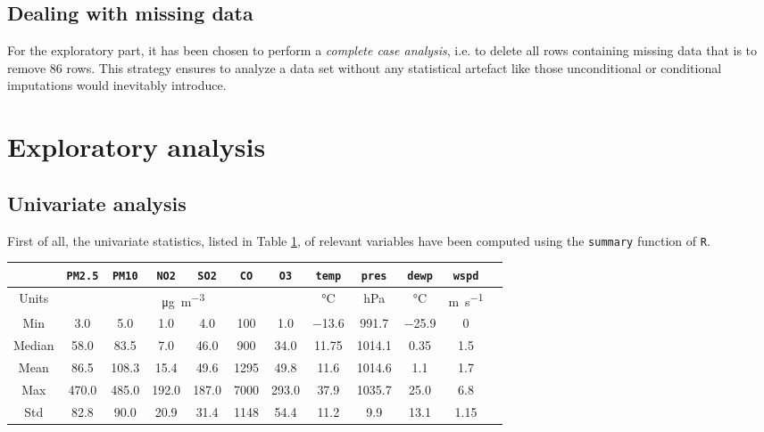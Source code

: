 \documentclass[a4paper, 12pt]{article}
\begin{document}
	\subsection{Dealing with missing data}
	For the exploratory part, it has been chosen to perform a \emph{complete case analysis}, i.e. to delete all rows containing missing data that is to remove \num{86} rows. This strategy ensures to analyze a data set without any statistical artefact like those unconditional or conditional imputations would inevitably introduce.
	\section{Exploratory analysis}
	\subsection{Univariate analysis} \label{sec:univariate_analysis}
	First of all, the univariate statistics, listed in Table \ref{tab:univariate_statistics}, of relevant variables have been computed using the \texttt{summary} function of \texttt{R}.
    \begin{table}[H]
        \centering
        \begin{tabular}{|c|c|c|c|c|c|c|c|c|c|c|c|}
            \cline{2-11}
            \multicolumn{1}{c|}{} & \texttt{PM2.5} & \texttt{PM10} & \texttt{NO2} & \texttt{SO2} & \texttt{CO} & \texttt{O3} & \texttt{temp} & \texttt{pres} & \texttt{dewp} & \texttt{wspd} \\ \hline
            Units & \multicolumn{6}{c|}{\si{\micro\gram\per\meter\cubed}} & \si{\degreeCelsius} & \si{\hecto\pascal} & \si{\degreeCelsius} & \si{\meter\per\second} \\ \hline\hline
            Min & \num{3.0} & \num{5.0} & \num{1.0} & \num{4.0} & \num{100} & \num{1.0} & \num{-13.6} & \num{991.7} & \num{-25.9} & \num{0} \\
            Median & \num{58.0} & \num{83.5} & \num{7.0} & \num{46.0} & \num{900} & \num{34.0} & \num{11.75} & \num{1014.1} & \num{0.35} & \num{1.5} \\
            Mean & \num{86.5} & \num{108.3} & \num{15.4} & \num{49.6} & \num{1295} & \num{49.8} & \num{11.6} & \num{1014.6} & \num{1.1} & \num{1.7} \\
            Max & \num{470.0} & \num{485.0} & \num{192.0} & \num{187.0} & \num{7000} & \num{293.0} & \num{37.9} & \num{1035.7} & \num{25.0} & \num{6.8} \\
            Std & \num{82.8} & \num{90.0} & \num{20.9} & \num{31.4} & \num{1148} & \num{54.4} & \num{11.2} & \num{9.9} & \num{13.1} & \num{1.15} \\ \hline
        \end{tabular}
        \label{tab:univariate_statistics}
    \end{table}
\end{document}
